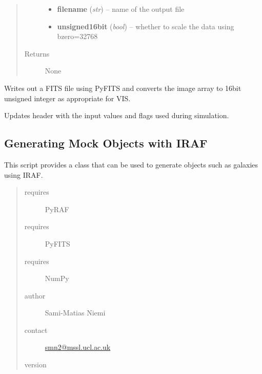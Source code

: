 \documentclass[a4paper,12pt,english]{sphinxmanual}
\begin{document}
\begin{fulllineitems}
\begin{fulllineitems}
\begin{quote}
\begin{description}
\begin{itemize}
\item {} 
\textbf{filename} (\emph{str}) -- name of the output file

\item {} 
\textbf{unsigned16bit} (\emph{bool}) -- whether to scale the data using bzero=32768

\end{itemize}

\item[{Returns}] \leavevmode
None

\end{description}\end{quote}

\end{fulllineitems}


\begin{fulllineitems}
\label{simulator:simulator.simulator.VISsimulator.writeOutputs}
Writes out a FITS file using PyFITS and converts the image array to 16bit unsigned integer as
appropriate for VIS.

Updates header with the input values and flags used during simulation.

\end{fulllineitems}


\end{fulllineitems}

\label{simulator:module-simulator.generateGalaxies}

\subsection{Generating Mock Objects with IRAF}
\label{simulator:generating-mock-objects-with-iraf}
This script provides a class that can be used to generate objects such as galaxies using IRAF.
\begin{quote}\begin{description}
\item[{requires}] \leavevmode
PyRAF

\item[{requires}] \leavevmode
PyFITS

\item[{requires}] \leavevmode
NumPy

\item[{author}] \leavevmode
Sami-Matias Niemi

\item[{contact}] \leavevmode
\href{mailto:smn2@mssl.ucl.ac.uk}{smn2@mssl.ucl.ac.uk}

\item[{version}] 

\end{description}\end{quote}
\end{document}
